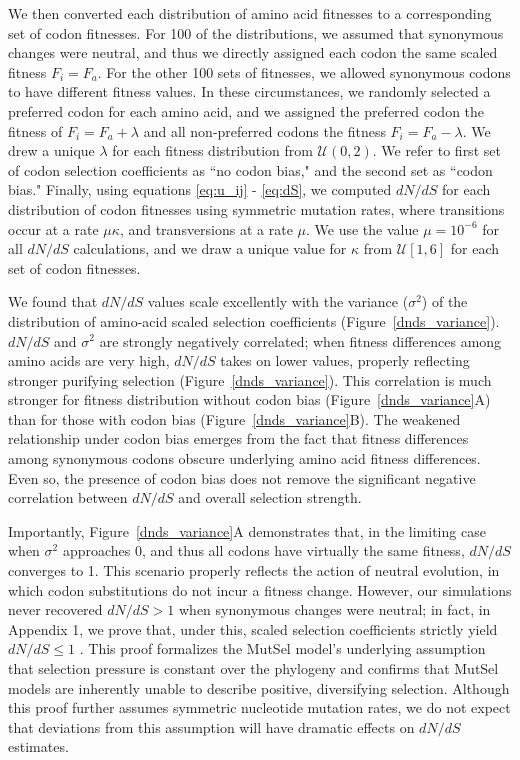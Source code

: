 \documentclass[11pt]{article}
\begin{document}
We then converted each distribution of amino acid fitnesses to a corresponding set of codon fitnesses. For 100 of the distributions, we assumed that synonymous changes were neutral, and thus we directly assigned each codon the same scaled fitness $F_i = F_a$. For the other 100 sets of fitnesses, we allowed synonymous codons to have different fitness values. In these circumstances, we randomly selected a preferred codon for each amino acid, and we assigned the preferred codon the fitness of $F_i = F_a + \lambda$ and all non-preferred codons the fitness $F_i = F_a - \lambda$. We drew a unique $\lambda$ for each fitness distribution from $\mathcal{U}(0,2)$. We refer to first set of codon selection coefficients as ``no codon bias," and the second set as ``codon bias." Finally, using equations \eqref{eq:u_ij} - \eqref{eq:dS}, we computed $dN/dS$ for each distribution of codon fitnesses using symmetric mutation rates, where transitions occur at a rate $\mu\kappa$, and transversions at a rate $\mu$. We use the value $\mu = 10^{-6}$ for all $dN/dS$ calculations, and we draw a unique value for $\kappa$ from $\mathcal{U}[1,6]$ for each set of codon fitnesses.

We found that $dN/dS$ values scale excellently with the variance ($\sigma^2$) of the distribution of amino-acid scaled selection coefficients (Figure~\ref{dnds_variance}). $dN/dS$ and $\sigma^2$ are strongly negatively correlated; when fitness differences among amino acids are very high, $dN/dS$ takes on lower values, properly reflecting stronger purifying selection (Figure~\ref{dnds_variance}). This correlation is much stronger for fitness distribution without codon bias (Figure~\ref{dnds_variance}A) than for those with codon bias (Figure~\ref{dnds_variance}B). The weakened relationship under codon bias emerges from the fact that fitness differences among synonymous codons obscure underlying amino acid fitness differences. Even so, the presence of codon bias does not remove the significant negative correlation between $dN/dS$ and overall selection strength.


Importantly, Figure~\ref{dnds_variance}A demonstrates that, in the limiting case when $\sigma^2$ approaches 0, and thus all codons have virtually the same fitness, $dN/dS$ converges to 1. This scenario properly reflects the action of neutral evolution, in which codon substitutions do not incur a fitness change. However, our simulations never recovered $dN/dS > 1$ when synonymous changes were neutral; in fact, in Appendix 1, we prove that, under this, scaled selection coefficients strictly yield $dN/dS \leq 1$ . This proof formalizes the MutSel model's underlying assumption that selection pressure is constant over the phylogeny and confirms that MutSel models are inherently unable to describe positive, diversifying selection. Although this proof further assumes symmetric nucleotide mutation rates, we do not expect that deviations from this assumption will have dramatic effects on $dN/dS$ estimates. 
\end{document}
